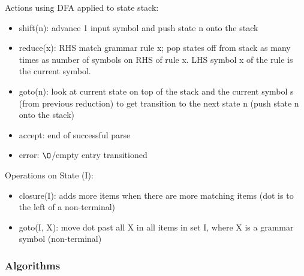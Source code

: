 \documentclass[8pt]{extarticle}
\begin{document}
\begin{multicols*}{2}
  Actions using DFA applied to state stack:
  \begin{itemize}
  \item shift(n): advance 1 input symbol and push state n onto the stack
  \item reduce(x): RHS match grammar rule x; pop states off from stack as many times as number of symbols on RHS of rule x. LHS symbol x of the rule is the current symbol.
  \item goto(n): look at current state on top of the stack and the current symbol s (from previous reduction) to get transition to the next state n (push state n onto the stack)
  \item accept: end of successful parse
  \item error: $\O$/empty entry transitioned
  \end{itemize}

  Operations on State (I):
  \begin{itemize}
  \item closure(I):  adds more items when there are more matching items (dot is to the left of a non-terminal)
  \item goto(I, X): move dot past all X in all items in set I, where X is a grammar symbol (non-terminal)
  \end{itemize}

  \vfill\null
  \columnbreak
  
  \subsubsection{Algorithms}


\end{multicols*}
\end{document}
